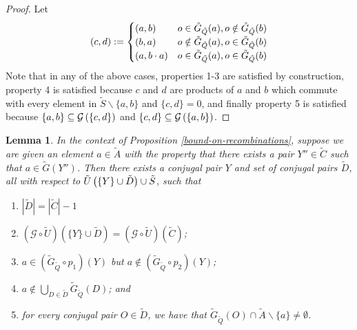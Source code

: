 \documentclass[twocolumn,showpacs,preprintnumbers,amsmath,amssymb,nofootinbib,pra,floatfix]{revtex4-1}
\newtheorem{lemma}{Lemma}
\newcommand{\set}{\tilde}
\newcommand{\genfun}{\mathcal{G}}
\begin{document}
\begin{proof}
Let
$$
(c,d):=
\begin{cases}
\paren{a,b} & o\in \set G_{\set Q}(a), o\notin \set G_{\set Q}(b) \\
\paren{b,a} &  o\notin \set G_{\set Q}(a), o\in \set G_{\set Q}(b) \\
\paren{a,b\cdot a} & o\in \set G_{\set Q}(a), o\in \set G_{\set Q}(b) \\
\end{cases}
$$
Note that in any of the above cases, properties 1-3 are satisfied by construction, property 4 is satisfied because $c$ and $d$ are products of $a$ and $b$ which commute with every element in $\set S\backslash \{a,b\}$ and $\{c,d\}=0$, and finally property 5 is satisfied because $\{a,b\}\subseteq \genfun\paren{\{c,d\}}$ and $\{c,d\}\subseteq \genfun\paren{\{a,b\}}$.
\end{proof}
\begin{lemma}
\label{directed-gaussian-elimination-of-logicals}
In the context of Proposition \ref{bound-on-recombinations}, suppose we are given an element $a\in \set A$ with the property that there exists a pair $Y''\in\set C$ such that $a\in\set G(Y'')$. Then there exists a conjugal pair $Y$ and set of conjugal pairs $\set D$, all with respect to $\set U\paren{\{Y\}\cup \set D} \cup \set S$, such that
\begin{enumerate}
\item $|\set D| = |\set C|-1$
\item $(\genfun\circ\set U)(\{Y\}\cup \set D)=(\genfun\circ\set U)(\set C)$;
\item $a\in (\set G_{\set Q}\circ p_1)(Y)$ but $a\notin (\set G_{\set Q}\circ p_2)(Y)$;
\item $a\notin \bigcup_{D\in \set D} \set G_{\set Q}(D)$; and
\item for every conjugal pair $O\in\set D$, we have that $\set G_{\set Q}(O) \cap \set A\backslash \{a\} \ne \emptyset$.
\end{enumerate}
\end{lemma}
\end{document}
